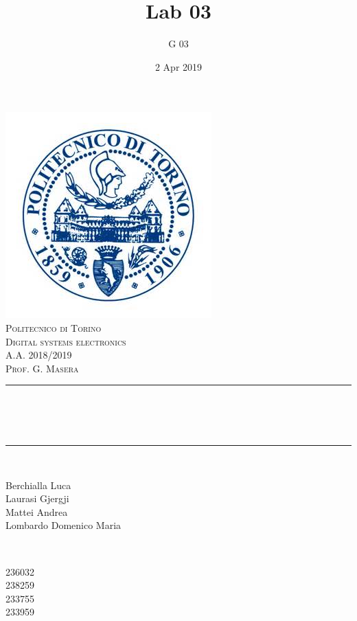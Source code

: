 \documentclass[12pt]{article}
\title{Lab 03}													%
\author{G 03}														%
\date{2 Apr 2019}														%
\makeatletter
\let\thetitle\@title
\let\thedate\@date
\makeatother
\begin{document}

\begin{titlepage}
	\centering
    \vspace*{0.5 cm}
    \includegraphics[scale = 0.75]{polito.jpg}\\[1.0 cm]				%
    \textsc{\LARGE Politecnico di Torino}\\[2.0 cm]						%
	\textsc{\Large Digital systems electronics\\ A.A. 2018/2019}\\[0.5 cm]		%
	\textsc{\Large Prof. G. Masera}\\[0.5 cm]		%
	\rule{\linewidth}{0.2 mm} \\[0.4 cm]
	{ \huge \bfseries \thetitle \\ \small \thedate}\\
	\rule{\linewidth}{0.2 mm} \\[1.5 cm]
	
	\begin{minipage}{0.4\textwidth}
		\begin{flushleft} \large
			Berchialla Luca\\												%
			Laurasi Gjergji
			\\
			
			Mattei Andrea\\
            Lombardo Domenico Maria\\
            
			\end{flushleft}
			\end{minipage}~
			\begin{minipage}{0.4\textwidth}
            
			\begin{flushright} \large
			236032\\													%
			238259\\
            233755\\
            233959\\
            
		\end{flushright}
        
	\end{minipage}\\[2 cm]
	
\end{titlepage}
\end{document}
